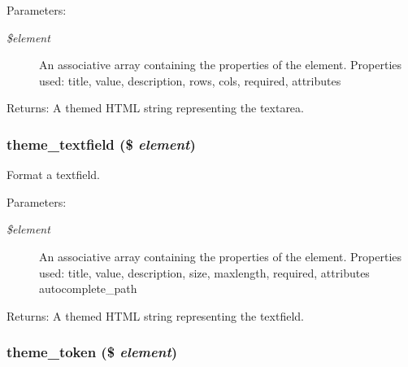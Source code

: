 \begin{Desc}
\item[Parameters:]
\begin{description}
\item[{\em \$element}]An associative array containing the properties of the element. Properties used: title, value, description, rows, cols, required, attributes \end{description}
\end{Desc}
\begin{Desc}
\item[Returns:]A themed HTML string representing the textarea. \end{Desc}
\hypertarget{group__themeable_gbecfa8f4d68e6eaf20469e668ad8028a}{
\subsubsection[{theme\_\-textfield}]{\setlength{\rightskip}{0pt plus 5cm}theme\_\-textfield (\$ {\em element})}}
\label{group__themeable_gbecfa8f4d68e6eaf20469e668ad8028a}


Format a textfield.

\begin{Desc}
\item[Parameters:]
\begin{description}
\item[{\em \$element}]An associative array containing the properties of the element. Properties used: title, value, description, size, maxlength, required, attributes autocomplete\_\-path \end{description}
\end{Desc}
\begin{Desc}
\item[Returns:]A themed HTML string representing the textfield. \end{Desc}
\hypertarget{group__themeable_gea7f1c9cd64fdf5a1444da708fa44aa3}{
\subsubsection[{theme\_\-token}]{\setlength{\rightskip}{0pt plus 5cm}theme\_\-token (\$ {\em element})}}
\label{group__themeable_gea7f1c9cd64fdf5a1444da708fa44aa3}


